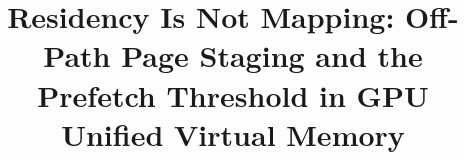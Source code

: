 \title{Residency Is Not Mapping: Off-Path Page Staging and the Prefetch
Threshold in GPU Unified Virtual Memory}
